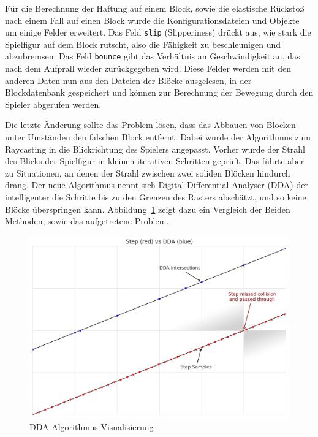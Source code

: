 \documentclass{article}
\begin{document}
Für die Berechnung der Haftung auf einem Block, sowie die elastische Rückstoß nach einem Fall auf einen Block wurde die Konfigurationsdateien und Objekte um einige Felder erweitert. Das Feld \texttt{slip} (Slipperiness) drückt aus, wie stark die Spielfigur auf dem Block rutscht, also die Fähigkeit zu beschleunigen und abzubremsen. Das Feld \texttt{bounce} gibt das Verhältnis an Geschwindigkeit an, das nach dem Aufprall wieder zurückgegeben wird. Diese Felder werden mit den anderen Daten nun aus den Dateien der Blöcke ausgelesen, in der Blockdatenbank gespeichert und können zur Berechnung der Bewegung durch den Spieler abgerufen werden.

Die letzte Änderung sollte das Problem lösen, dass das Abbauen von Blöcken unter Umständen den falschen Block entfernt. Dabei wurde der Algorithmus zum Raycasting in die Blickrichtung des Spielers angepasst. Vorher wurde der Strahl des Blicks der Spielfigur in kleinen iterativen Schritten geprüft. Das führte aber zu Situationen, an denen der Strahl zwischen zwei soliden Blöcken hindurch drang. Der neue Algorithmus nennt sich Digital Differential Analyser (DDA) der intelligenter die Schritte bis zu den Grenzen des Rasters abschätzt, und so keine Blöcke überspringen kann. Abbildung~\ref{pic:dda} zeigt dazu ein Vergleich der Beiden Methoden, sowie das aufgetretene Problem.

\begin{figure} [ht]
  \centering
  \includegraphics[width=1\linewidth]{dda.png}
  \caption{DDA Algorithmus Visualisierung}
  \label{pic:dda}
\end{figure}

\FloatBarrier
\end{document}
